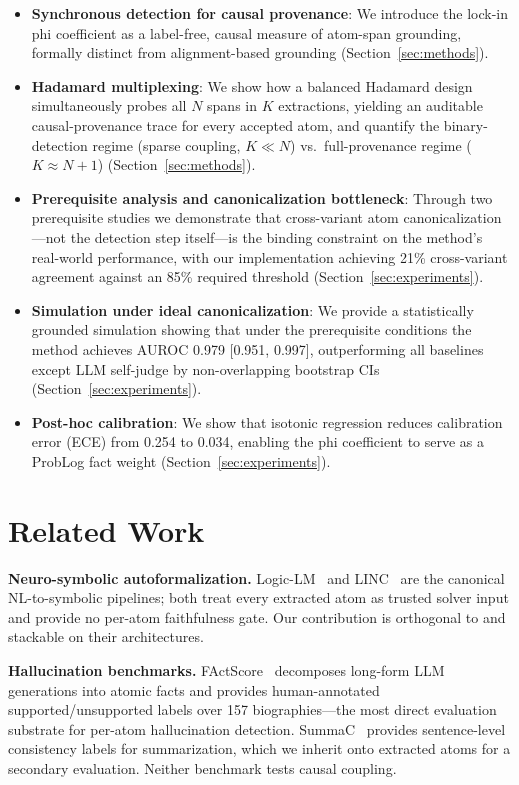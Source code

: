 \documentclass[11pt,letterpaper]{article}
\begin{document}
\begin{itemize}
  \item \textbf{Synchronous detection for causal provenance}: We introduce the lock-in phi coefficient as a label-free,
    causal measure of atom-span grounding, formally distinct from alignment-based grounding (Section~\ref{sec:methods}).
  \item \textbf{Hadamard multiplexing}: We show how a balanced Hadamard design simultaneously probes all $N$ spans in
    $K$ extractions, yielding an auditable causal-provenance trace for every accepted atom, and quantify the
    binary-detection regime (sparse coupling, $K \ll N$) vs.\ full-provenance regime ($K \approx N+1$)
    (Section~\ref{sec:methods}).
  \item \textbf{Prerequisite analysis and canonicalization bottleneck}: Through two prerequisite studies we demonstrate
    that cross-variant atom canonicalization---not the detection step itself---is the binding constraint on the method's
    real-world performance, with our implementation achieving 21\% cross-variant agreement against an 85\% required
    threshold (Section~\ref{sec:experiments}).
  \item \textbf{Simulation under ideal canonicalization}: We provide a statistically grounded simulation showing that
    under the prerequisite conditions the method achieves AUROC 0.979 [0.951, 0.997], outperforming all baselines
    except LLM self-judge by non-overlapping bootstrap CIs (Section~\ref{sec:experiments}).
  \item \textbf{Post-hoc calibration}: We show that isotonic regression reduces calibration error (ECE) from 0.254 to
    0.034, enabling the phi coefficient to serve as a ProbLog fact weight
    (Section~\ref{sec:experiments}).
\end{itemize}

\section{Related Work}

\textbf{Neuro-symbolic autoformalization.}
Logic-LM~\citep{Pan2023} and LINC~\citep{Olausson2023} are the canonical NL-to-symbolic pipelines; both treat every
extracted atom as trusted solver input and provide no per-atom faithfulness gate. Our contribution is orthogonal to and
stackable on their architectures.

\textbf{Hallucination benchmarks.}
FActScore~\citep{Min2023} decomposes long-form LLM generations into atomic facts and provides human-annotated
supported/unsupported labels over 157 biographies---the most direct evaluation substrate for per-atom hallucination
detection. SummaC~\citep{Laban2021} provides sentence-level consistency labels for summarization, which we inherit onto
extracted atoms for a secondary evaluation. Neither benchmark tests causal coupling.
\end{document}
